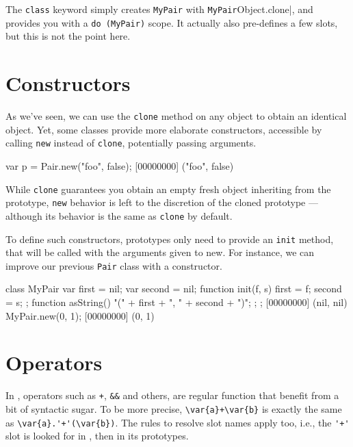 The \lstinline{class} keyword simply creates \lstinline|MyPair| with
\lstinline|MyPair|Object.clone|, and provides you with a
\lstinline|do (MyPair)| scope. It actually also pre-defines a few
slots, but this is not the point here.

\section{Constructors}
\label{sec:tut:ctor}
As we've seen, we can use the \lstinline|clone| method on any object
to obtain an identical object. Yet, some classes provide more
elaborate constructors, accessible by calling \lstinline{new} instead
of \lstinline{clone}, potentially passing arguments.

\begin{urbiscript}[firstnumber=1]
var p = Pair.new("foo", false);
[00000000] ("foo", false)
\end{urbiscript}

While \lstinline{clone} guarantees you obtain an empty fresh object
inheriting from the prototype, \lstinline{new} behavior is left to the
discretion of the cloned prototype --- although its behavior is the
same as \lstinline{clone} by default.

To define such constructors, prototypes only need to provide an
\lstinline{init} method, that will be called with the arguments given to
new. For instance, we can improve our previous \lstinline{Pair} class
with a constructor.

\begin{urbiscript}[firstnumber=1]
class MyPair
{
  var first = nil;
  var second = nil;
  function init(f, s) { first = f;   second = s;  };
  function asString() { "(" + first + ", " + second + ")"; };
};
[00000000] (nil, nil)
MyPair.new(0, 1);
[00000000] (0, 1)
\end{urbiscript}

\section{Operators}
\label{sec:tut:operators}

In \us, operators such as \lstinline|+|, \lstinline|&&| and others,
are regular function that benefit from a bit of syntactic sugar.  To
be more precise, \lstinline|\var{a}+\var{b}| is exactly the same as
\lstinline|\var{a}.'+'(\var{b})|.  The rules to resolve slot names
apply too, i.e., the \lstinline|'+'| slot is looked for in ,
then in its prototypes.

